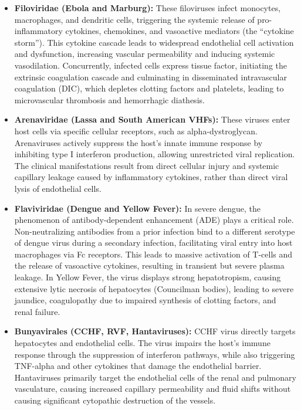 \begin{itemize}
\item \textbf{Filoviridae (Ebola and Marburg):} These filoviruses infect monocytes, macrophages, and dendritic cells, triggering the systemic release of pro-inflammatory cytokines, chemokines, and vasoactive mediators (the ``cytokine storm''). This cytokine cascade leads to widespread endothelial cell activation and dysfunction, increasing vascular permeability and inducing systemic vasodilation. Concurrently, infected cells express tissue factor, initiating the extrinsic coagulation cascade and culminating in disseminated intravascular coagulation (DIC), which depletes clotting factors and platelets, leading to microvascular thrombosis and hemorrhagic diathesis.
\item \textbf{Arenaviridae (Lassa and South American VHFs):} These viruses enter host cells via specific cellular receptors, such as alpha-dystroglycan. Arenaviruses actively suppress the host's innate immune response by inhibiting type I interferon production, allowing unrestricted viral replication. The clinical manifestations result from direct cellular injury and systemic capillary leakage caused by inflammatory cytokines, rather than direct viral lysis of endothelial cells.
\item \textbf{Flaviviridae (Dengue and Yellow Fever):} In severe dengue, the phenomenon of antibody-dependent enhancement (ADE) plays a critical role. Non-neutralizing antibodies from a prior infection bind to a different serotype of dengue virus during a secondary infection, facilitating viral entry into host macrophages via Fc receptors. This leads to massive activation of T-cells and the release of vasoactive cytokines, resulting in transient but severe plasma leakage. In Yellow Fever, the virus displays strong hepatotropism, causing extensive lytic necrosis of hepatocytes (Councilman bodies), leading to severe jaundice, coagulopathy due to impaired synthesis of clotting factors, and renal failure.
\item \textbf{Bunyavirales (CCHF, RVF, Hantaviruses):} CCHF virus directly targets hepatocytes and endothelial cells. The virus impairs the host's immune response through the suppression of interferon pathways, while also triggering TNF-alpha and other cytokines that damage the endothelial barrier. Hantaviruses primarily target the endothelial cells of the renal and pulmonary vasculature, causing increased capillary permeability and fluid shifts without causing significant cytopathic destruction of the vessels.
\end{itemize}

